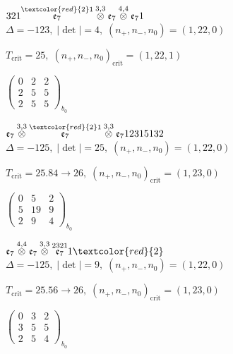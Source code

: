 \documentclass[10pt]{article}
\begin{document}
\smallskip

$321\overset{\textcolor{red}{2}1}{\mathfrak{e}_7}\overset{3,3}{\otimes}\mathfrak{e}_7\overset{4,4}{\otimes}\mathfrak{e}_71$ \quad $\Delta=-123,\; |\det|=4,\; (n_+,n_-,n_0)=(1,22,0)$

\hspace{1em}$T_{\text{crit}}=25,\; (n_+,n_-,n_0)_{\text{crit}}=(1,22,1)$

\hspace{2em}$\left(\begin{smallmatrix}0 & 2 & 2 \\ 2 & 5 & 5 \\ 2 & 5 & 5\end{smallmatrix}\right)_{\!b_0}$

\smallskip

$\mathfrak{e}_7\overset{3,3}{\otimes}\overset{\textcolor{red}{2}1}{\mathfrak{e}_7}\overset{3,3}{\otimes}\mathfrak{e}_712315132$ \quad $\Delta=-125,\; |\det|=25,\; (n_+,n_-,n_0)=(1,22,0)$

\hspace{1em}$T_{\text{crit}}=25.84 \to 26,\; (n_+,n_-,n_0)_{\text{crit}}=(1,23,0)$

\hspace{2em}$\left(\begin{smallmatrix}0 & 5 & 2 \\ 5 & 19 & 9 \\ 2 & 9 & 4\end{smallmatrix}\right)_{\!b_0}$

\smallskip

$\mathfrak{e}_7\overset{4,4}{\otimes}\mathfrak{e}_7\overset{3,3}{\otimes}\overset{2321}{\mathfrak{e}_7}1\textcolor{red}{2}$ \quad $\Delta=-125,\; |\det|=9,\; (n_+,n_-,n_0)=(1,22,0)$

\hspace{1em}$T_{\text{crit}}=25.56 \to 26,\; (n_+,n_-,n_0)_{\text{crit}}=(1,23,0)$

\hspace{2em}$\left(\begin{smallmatrix}0 & 3 & 2 \\ 3 & 5 & 5 \\ 2 & 5 & 4\end{smallmatrix}\right)_{\!b_0}$
\end{document}
